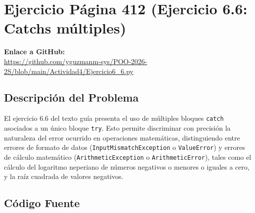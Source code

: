 \documentclass[12pt,letterpaper]{article}
\begin{document}
\clearpage

\section{Ejercicio Página 412 (Ejercicio 6.6: Catchs múltiples)}

\noindent\textbf{Enlace a GitHub:} \\
\url{https://github.com/yguzmanm-sys/POO-2026-2S/blob/main/Actividad4/Ejercicio6_6.py}

\subsection{Descripción del Problema}
El ejercicio 6.6 del texto guía presenta el uso de múltiples bloques \texttt{catch} asociados a un único bloque \texttt{try}. Esto permite discriminar con precisión la naturaleza del error ocurrido en operaciones matemáticas, distinguiendo entre errores de formato de datos (\texttt{InputMismatchException} o \texttt{ValueError}) y errores de cálculo matemático (\texttt{ArithmeticException} o \texttt{ArithmeticError}), tales como el cálculo del logaritmo neperiano de números negativos o menores o iguales a cero, y la raíz cuadrada de valores negativos.

\subsection{Código Fuente}
\end{document}
